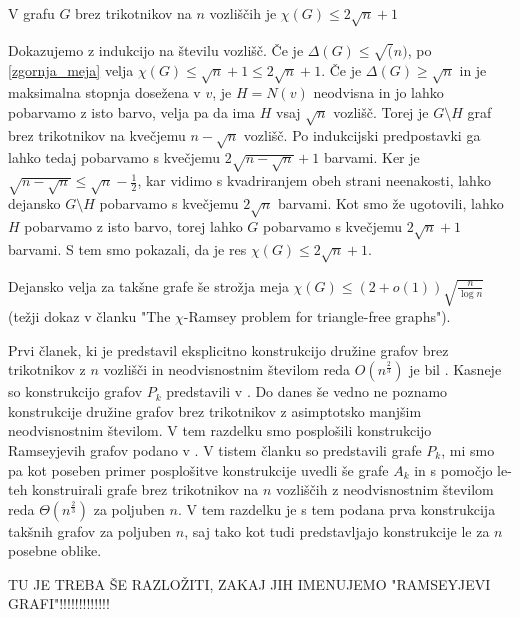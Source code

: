 \documentclass[mat1, tisk]{fmfdelo}
\begin{document}
    \begin{trditev}
        V grafu $G$ brez trikotnikov na $n$ vozliščih je $\chi(G) \leq 2\sqrt{n} + 1$
    \end{trditev}

    \begin{dokaz}
        Dokazujemo z indukcijo na številu vozlišč. Če je $\Delta(G) \leq \sqrt(n)$, po \ref{zgornja_meja} velja $\chi(G) \leq \sqrt{n} + 1 \leq 2\sqrt{n} + 1$. Če je $\Delta(G) \geq \sqrt{n}$ in je maksimalna stopnja dosežena v $v$, je $H = N(v)$ neodvisna in jo lahko pobarvamo z isto barvo, velja
        pa da ima $H$ vsaj $\sqrt{n}$ vozlišč. Torej je $G \setminus H$ graf brez trikotnikov na kvečjemu $n - \sqrt{n}$ vozlišč. Po indukcijski predpostavki ga lahko tedaj pobarvamo s kvečjemu $2\sqrt{n - \sqrt{n}} + 1$ barvami. Ker je $\sqrt{n - \sqrt{n}} \leq \sqrt{n} - \frac{1}{2}$, kar vidimo
        s kvadriranjem obeh strani neenakosti, lahko dejansko $G \setminus H$ pobarvamo s kvečjemu $2\sqrt{n}$ barvami. Kot smo že ugotovili, lahko $H$ pobarvamo z isto barvo, torej lahko $G$ pobarvamo s kvečjemu $2\sqrt{n} + 1$ barvami. S tem smo pokazali, da je res $\chi(G) \leq 2\sqrt{n} + 1$.
    \end{dokaz}

Dejansko velja za takšne grafe še strožja meja $\chi(G) \leq (2 + o(1))\sqrt{\frac{n}{\log{n}}}$ (težji dokaz v članku "The $\chi$-Ramsey problem for triangle-free graphs").

Prvi članek, ki je predstavil eksplicitno konstrukcijo družine grafov brez trikotnikov z $n$ vozlišči in neodvisnostnim številom reda $O(n^{\frac{2}{3}})$ je bil \cite{Alon94}. Kasneje so konstrukcijo grafov $P_k$ predstavili v \cite{CodenottiPR00}. Do danes še vedno ne poznamo konstrukcije družine grafov brez trikotnikov
z asimptotsko manjšim neodvisnostnim številom. V tem razdelku smo posplošili konstrukcijo Ramseyjevih grafov podano v \cite{CodenottiPR00}. V tistem članku so predstavili grafe $P_k$, mi smo pa kot poseben primer posplošitve konstrukcije uvedli še grafe $A_k$ in s pomočjo le-teh konstruirali grafe brez
trikotnikov na $n$ vozliščih z neodvisnostnim številom reda $\Theta(n^{\frac{2}{3}})$ za poljuben $n$. V tem razdelku je s tem podana prva konstrukcija takšnih grafov za poljuben $n$, saj tako \cite{Alon94} kot tudi \cite{CodenottiPR00} predstavljajo konstrukcije le za $n$ posebne oblike.

TU JE TREBA ŠE RAZLOŽITI, ZAKAJ JIH IMENUJEMO "RAMSEYJEVI GRAFI"!!!!!!!!!!!!!
\end{document}
